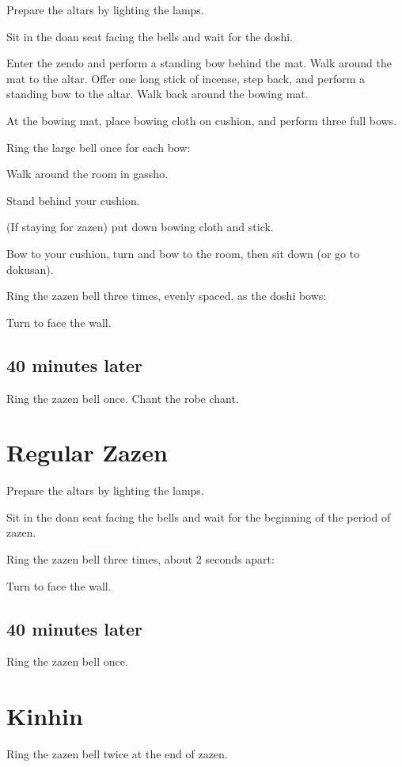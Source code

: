 \documentclass{chantbook}
\begin{document}
\doan Prepare the altars by lighting the lamps.

Sit in the doan seat facing the bells and wait for the doshi.

\doshi Enter the zendo and perform a standing bow behind the mat. Walk around
the mat to the altar. Offer one long stick of incense, step back, and perform a
standing bow to the altar. Walk back around the bowing mat.

At the bowing mat, place bowing cloth on cushion, and perform three full bows.

\doan Ring the large bell once for each bow:
\jundoBows

\doshi Walk around the room in gassho.

Stand behind your cushion.

(If staying for zazen) put down bowing cloth and stick.

Bow to your cushion, turn and bow to the room, then sit down (or go to dokusan).

\doan Ring the zazen bell three times, evenly spaced, as the doshi bows:
\jundoStartZazen

Turn to face the wall.

\section*{40 minutes later}
\doan Ring the zazen bell once. \bigspace\zazenbell
\sangha Chant the robe chant.

\chapter{Regular Zazen}
\doan Prepare the altars by lighting the lamps.

Sit in the doan seat facing the bells and wait for the beginning of the period
of zazen.

\doan Ring the zazen bell three times, about 2 seconds apart:
\startZazenBells

Turn to face the wall.

\section*{40 minutes later}

\doan Ring the zazen bell once. \bigspace\zazenbell

\chapter{Kinhin}
\doan Ring the zazen bell twice at the end of zazen.
\kinhinBells
\end{document}
